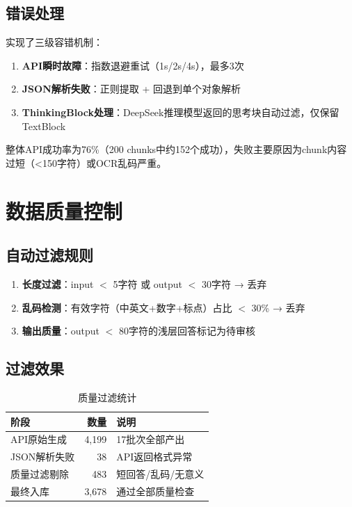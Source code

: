 \documentclass[12pt,a4paper]{ctexart}
\begin{document}
\subsection{错误处理}

实现了三级容错机制：
\begin{enumerate}[nosep]
    \item \textbf{API瞬时故障}：指数退避重试（1s/2s/4s），最多3次
    \item \textbf{JSON解析失败}：正则提取 + 回退到单个对象解析
    \item \textbf{ThinkingBlock处理}：DeepSeek推理模型返回的思考块自动过滤，仅保留TextBlock
\end{enumerate}

整体API成功率为76\%（200 chunks中约152个成功），失败主要原因为chunk内容过短（<150字符）或OCR乱码严重。

\section{数据质量控制}

\subsection{自动过滤规则}

\begin{enumerate}[nosep]
    \item \textbf{长度过滤}：input $<$ 5字符 或 output $<$ 30字符 → 丢弃
    \item \textbf{乱码检测}：有效字符（中英文+数字+标点）占比 $<$ 30\% → 丢弃
    \item \textbf{输出质量}：output $<$ 80字符的浅层回答标记为待审核
\end{enumerate}

\subsection{过滤效果}

\begin{table}[htbp]\centering
\caption{质量过滤统计}
\begin{tabular}{@{}lrl@{}}
\toprule
\textbf{阶段} & \textbf{数量} & \textbf{说明} \\
\midrule
API原始生成 & 4,199 & 17批次全部产出 \\
JSON解析失败 & 38 & API返回格式异常 \\
质量过滤剔除 & 483 & 短回答/乱码/无意义 \\
最终入库 & 3,678 & 通过全部质量检查 \\
\bottomrule
\end{tabular}
\end{table}
\end{document}
